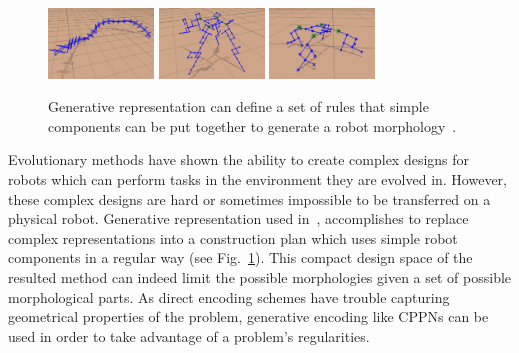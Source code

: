\begin{figure}[h!]
\centering
\includegraphics[width=0.25\textwidth,height=0.2\textwidth]{../Figures/Misc/rules1.png}
\includegraphics[width=0.25\textwidth,height=0.2\textwidth]{../Figures/Misc/rules2.png}
\includegraphics[width=0.25\textwidth,height=0.2\textwidth]{../Figures/Misc/rules3.png}
\caption{Generative representation can define a set of rules that simple components can be put together to generate a robot morphology~\citep{hornby2003generative}.}
\label{fig:rules}
\end{figure}

Evolutionary methods have shown the ability to create complex designs for robots which can perform tasks in the environment they are evolved in. However, these complex designs are hard or sometimes impossible to be transferred on a physical robot. Generative representation used in~\citep{hornby2003generative}, accomplishes to replace complex representations into a construction plan which uses simple robot components in a regular way (see Fig.~\ref{fig:rules}). This compact design space of the resulted method can indeed limit the possible morphologies given a set of possible morphological parts. As direct encoding schemes have trouble capturing geometrical properties of the problem, generative encoding like CPPNs can be used in order to take advantage of a problem's regularities.

